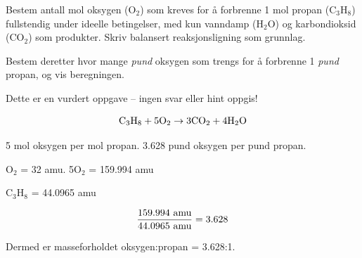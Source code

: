 

Bestem antall mol oksygen (O$_{2}$) som kreves for å forbrenne 1 mol propan (C$_{3}$H$_{8}$) fullstendig under ideelle betingelser, med kun vanndamp (H$_{2}$O) og karbondioksid (CO$_{2}$) som produkter. Skriv balansert reaksjonsligning som grunnlag.

\vskip 100pt

Bestem deretter hvor mange {\it pund} oksygen som trengs for å forbrenne 1 {\it pund} propan, og vis beregningen.

\vfil

\eject






Dette er en vurdert oppgave -- ingen svar eller hint oppgis!







$$\hbox{C}_3\hbox{H}_8 + 5\hbox{O}_2 \to 3\hbox{CO}_2 + 4\hbox{H}_2\hbox{O}$$

5 mol oksygen per mol propan. 3.628 pund oksygen per pund propan.

\vskip 10pt

O$_{2}$ = 32 amu. 5O$_{2}$ = 159.994 amu

\vskip 10pt

C$_{3}$H$_{8}$ = 44.0965 amu

$${159.994 \hbox{ amu} \over 44.0965 \hbox{ amu}} = 3.628$$

Dermed er masseforholdet oksygen:propan = 3.628:1.



